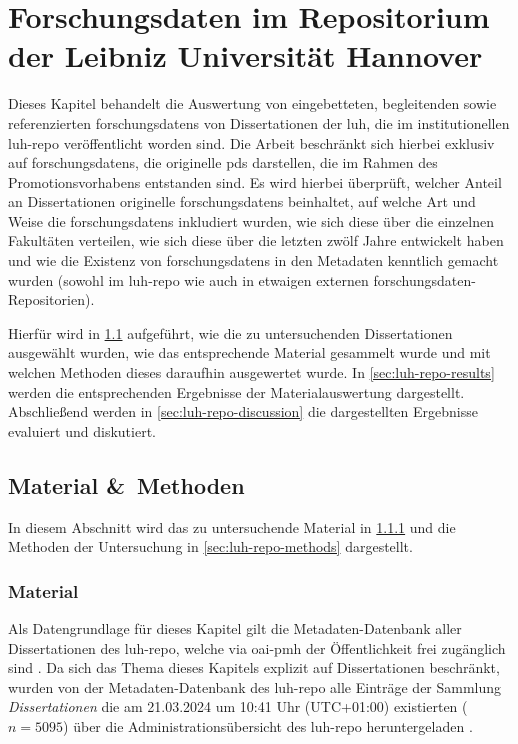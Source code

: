 \chapter{Forschungsdaten im Repositorium der Leibniz Universität Hannover}\label{ch:luh-repo}
Dieses Kapitel behandelt die Auswertung von eingebetteten, begleitenden sowie referenzierten \glspl{forschungsdaten} von Dissertationen der \gls{luh}, die im institutionellen \gls{luh-repo} veröffentlicht worden sind.
Die Arbeit beschränkt sich hierbei exklusiv auf \glspl{forschungsdaten}, die originelle \glspl{pd} darstellen, die im Rahmen des Promotionsvorhabens entstanden sind.
Es wird hierbei überprüft, welcher Anteil an Dissertationen originelle \glspl{forschungsdaten} beinhaltet, auf welche Art und Weise die \glspl{forschungsdaten} inkludiert wurden, wie sich diese über die einzelnen Fakultäten verteilen, wie sich diese über die letzten zwölf Jahre entwickelt haben und wie die Existenz von \glspl{forschungsdaten} in den Metadaten kenntlich gemacht wurden (sowohl im \gls{luh-repo} wie auch in etwaigen externen \gls{forschungsdaten}-Repositorien).

Hierfür wird in \cref{sec:luh-repo-material-methods} aufgeführt, wie die zu untersuchenden Dissertationen ausgewählt wurden, wie das entsprechende Material gesammelt wurde und mit welchen Methoden dieses daraufhin ausgewertet wurde.
In \cref{sec:luh-repo-results} werden die entsprechenden Ergebnisse der Materialauswertung dargestellt.
Abschließend werden in \cref{sec:luh-repo-discussion} die dargestellten Ergebnisse evaluiert und diskutiert.

\section{Material \&\ Methoden}\label{sec:luh-repo-material-methods}
In diesem Abschnitt wird das zu untersuchende Material in \cref{sec:luh-repo-material} und die Methoden der Untersuchung in \cref{sec:luh-repo-methods} dargestellt.

\subsection{Material}\label{sec:luh-repo-material}
Als Datengrundlage für dieses Kapitel gilt die Metadaten-Datenbank aller Dissertationen des \gls{luh-repo}, welche via \gls{oai-pmh} der Öffentlichkeit frei zugänglich sind \autocite{luh-repo}.
Da sich das Thema dieses Kapitels explizit auf Dissertationen beschränkt, wurden von der Metadaten-Datenbank des \gls{luh-repo} alle Einträge der Sammlung \textit{Dissertationen} die am 21.03.2024 um 10:41 Uhr (UTC+01:00) existierten ($n=5095$) über die Administrationsübersicht des \gls{luh-repo} heruntergeladen \autocite{my-dataset}.

